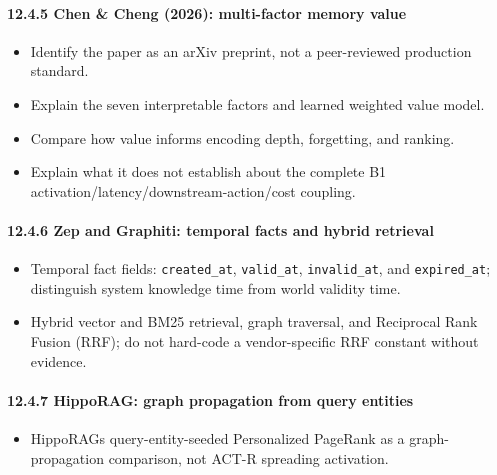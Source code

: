\paragraph{12.4.5 Chen \& Cheng (2026): multi-factor memory value}\label{1245-chen--cheng-2026-multi-factor-memory-value}

\begin{itemize}
\tightlist
\item
  Identify the paper as an arXiv preprint, not a peer-reviewed production standard.
\item
  Explain the seven interpretable factors and learned weighted value model.
\item
  Compare how value informs encoding depth, forgetting, and ranking.
\item
  Explain what it does not establish about the complete B1 activation/latency/downstream-action/cost coupling.
\end{itemize}

\paragraph{12.4.6 Zep and Graphiti: temporal facts and hybrid retrieval}\label{1246-zep-and-graphiti-temporal-facts-and-hybrid-retrieval}

\begin{itemize}
\tightlist
\item
  Temporal fact fields: \texttt{created\_at}, \texttt{valid\_at}, \texttt{invalid\_at}, and \texttt{expired\_at}; distinguish system knowledge time from world validity time.
\item
  Hybrid vector and BM25 retrieval, graph traversal, and Reciprocal Rank Fusion (RRF); do not hard-code a vendor-specific RRF constant without evidence.
\end{itemize}

\paragraph{12.4.7 HippoRAG: graph propagation from query entities}\label{1247-hipporag-graph-propagation-from-query-entities}

\begin{itemize}
\tightlist
\item
  HippoRAG\textquotesingle s query-entity-seeded Personalized PageRank as a graph-propagation comparison, not ACT-R spreading activation.
\end{itemize}

